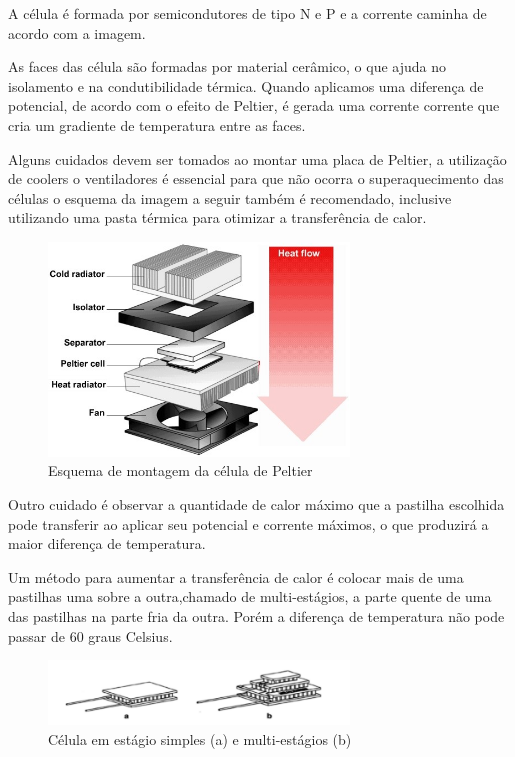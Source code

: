 A célula é formada por semicondutores de tipo N e P e a corrente caminha de acordo com a imagem.

As faces das célula são formadas por material cerâmico, o que ajuda no isolamento e na condutibilidade térmica. Quando aplicamos uma diferença de potencial, de acordo com o efeito de Peltier, é gerada uma corrente corrente que cria um gradiente de temperatura entre as faces.

Alguns cuidados devem ser tomados ao montar uma placa de Peltier, a utilização de coolers o ventiladores é essencial para que não ocorra o superaquecimento das células o esquema da imagem a seguir também é recomendado, inclusive utilizando uma pasta térmica para otimizar a transferência de calor.

\begin{figure}[H]
\centering
\includegraphics[width=8cm]{figuras/peltier2.jpg}
\caption{Esquema de montagem da célula de Peltier}
\end{figure}

Outro cuidado é observar a quantidade de calor máximo que a pastilha escolhida pode transferir ao aplicar seu potencial e corrente máximos, o que produzirá a maior diferença de temperatura. 

Um método para aumentar a transferência de calor é colocar mais de uma pastilhas uma sobre a outra,chamado de multi-estágios, a parte quente de uma das pastilhas na parte fria da outra. Porém a diferença de temperatura não pode passar de 60 graus Celsius.

\begin{figure}[H]
\centering
\includegraphics[width=8cm]{figuras/peltier3.png}
\caption{Célula em estágio simples (a) e multi-estágios (b)}
\end{figure}